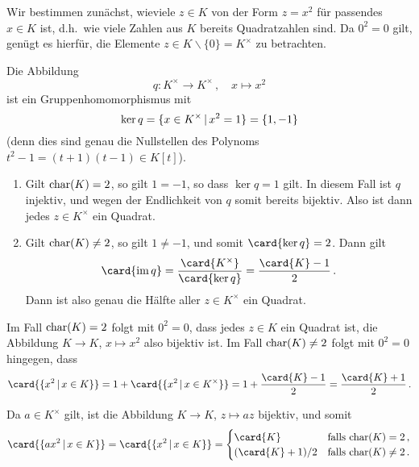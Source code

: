 \section{}





\subsection{}

Wir bestimmen zunächst, wieviele $z \in K$ von der Form $z = x^2$ für passendes $x \in K$ ist, d.h.\ wie viele Zahlen aus $K$ bereits Quadratzahlen sind.
Da $0^2 = 0$ gilt, genügt es hierfür, die Elemente $z \in K \smallsetminus \{0\} = K^\times$ zu betrachten.

Die Abbildung
\[
          q
  \colon  K^\times
  \to     K^\times \,,
  \quad   x
  \mapsto x^2
\]
ist ein Gruppenhomomorphismus mit
\[
    \ker q
  = \{
      x \in K^\times
    \suchthat
      x^2 = 1
    \}
  = \{1, -1\}
\]
(denn dies sind genau die Nullstellen des Polynoms $t^2 - 1 = (t+1)(t-1) \in K[t]$).
\begin{enumerate}
  \item
    Gilt $\operatorname{char}(K) = 2$, so gilt $1 = -1$, so dass $\ker q = 1$ gilt.
    In diesem Fall ist $q$ injektiv, und wegen der Endlichkeit von $q$ somit bereits bijektiv.
    Also ist dann jedes $z \in K^\times$ ein Quadrat.
  \item
    Gilt $\operatorname{char}(K) \neq 2$, so gilt $1 \neq -1$, und somit $\card{\ker q} = 2$.
    Dann gilt
    \[
        \card{\im q}
      = \frac{\card{K^\times}}{\card{\ker q}}
      = \frac{\card{K} - 1}{2} \,.
    \]
    Dann ist also genau die Hälfte aller $z \in K^\times$ ein Quadrat.
\end{enumerate}
Im Fall $\operatorname{char}(K) = 2$ folgt mit $0^2 = 0$, dass jedes $z \in K$ ein Quadrat ist, die Abbildung $K \to K$, $x \mapsto x^2$ also bijektiv ist.
Im Fall $\operatorname{char}(K) \neq 2$ folgt mit $0^2 = 0$ hingegen, dass
\[
    \card{ \{ x^2 \suchthat x \in K \} }
  = 1 + \card{ \{ x^2 \suchthat x \in K^\times \} }
  = 1 + \frac{\card{K} - 1}{2}
  = \frac{\card{K} + 1}{2} \,.  
\]

Da $a \in K^\times$ gilt, ist die Abbildung $K \to K$, $z \mapsto az$ bijektiv, und somit
\[
    \card{ \{a x^2 \suchthat x \in K\} }
  = \card{ \{x^2 \suchthat x \in K\} }
  = \begin{cases}
      \card{K}        & \text{falls $\ringchar{K} = 2$}     \,, \\
      (\card{K}+1)/2  & \text{falls $\ringchar{K} \neq 2$}  \,.
    \end{cases}
\]






